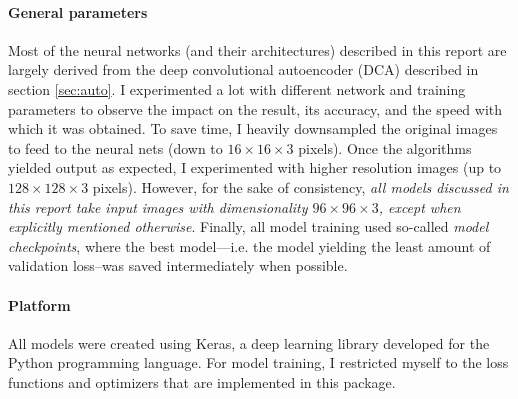 \paragraph{General parameters} Most of the neural networks (and their architectures) described in this report are largely derived from the deep convolutional autoencoder (DCA) described in section \textcolor{blue}{\ref{sec:auto}}. I experimented a lot with different network and training parameters to observe the impact on the result, its accuracy, and the speed with which it was obtained. To save time, I heavily downsampled the original images to feed to the neural nets (down to $16 \times 16 \times 3$ pixels). Once the algorithms yielded output as expected, I experimented with higher resolution images (up to $128 \times 128 \times 3$ pixels). However, for the sake of consistency, \emph{all models discussed in this report take input images with dimensionality $96 \times 96 \times 3$, except when explicitly mentioned otherwise}. Finally, all model training used so-called \textit{model checkpoints}, where the best model---i.e. the model yielding the least amount of validation loss--was saved intermediately when possible.

\paragraph{Platform} All models were created using Keras, a deep learning library developed for the Python programming language. For model training, I restricted myself to the loss functions and optimizers that are implemented in this package.
